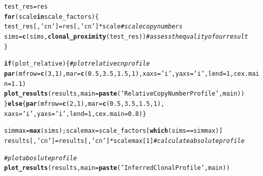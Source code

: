 \documentclass[12pt]{article}\usepackage[]{graphicx}\usepackage[]{color}
\makeatletter
\newcommand{\hlnum}[1]{\textcolor[rgb]{0.686,0.059,0.569}{#1}}%
\newcommand{\hlstr}[1]{\textcolor[rgb]{0.192,0.494,0.8}{#1}}%
\newcommand{\hlcom}[1]{\textcolor[rgb]{0.678,0.584,0.686}{\textit{#1}}}%
\newcommand{\hlopt}[1]{\textcolor[rgb]{0,0,0}{#1}}%
\newcommand{\hlstd}[1]{\textcolor[rgb]{0.345,0.345,0.345}{#1}}%
\newcommand{\hlkwa}[1]{\textcolor[rgb]{0.161,0.373,0.58}{\textbf{#1}}}%
\newcommand{\hlkwb}[1]{\textcolor[rgb]{0.69,0.353,0.396}{#1}}%
\newcommand{\hlkwc}[1]{\textcolor[rgb]{0.333,0.667,0.333}{#1}}%
\newcommand{\hlkwd}[1]{\textcolor[rgb]{0.737,0.353,0.396}{\textbf{#1}}}%
\newenvironment{kframe}{%
 \def\at@end@of@kframe{}%
 \ifinner\ifhmode%
  \def\at@end@of@kframe{\end{minipage}}%
  \begin{minipage}{\columnwidth}%
 \fi\fi%
 \def\FrameCommand##1{\hskip\@totalleftmargin \hskip-\fboxsep
 \colorbox{shadecolor}{##1}\hskip-\fboxsep
     \hskip-\linewidth \hskip-\@totalleftmargin \hskip\columnwidth}%
 \MakeFramed {\advance\hsize-\width
   \@totalleftmargin\z@ \linewidth\hsize
   \@setminipage}}%
 {\par\unskip\endMakeFramed%
 \at@end@of@kframe}
\newenvironment{knitrout}{}{} %
\makeatother
\begin{document}
\begin{knitrout}
\begin{kframe}
\begin{alltt}
  \hlstd{test_res}\hlkwb{=}\hlstd{res}
  \hlkwa{for} \hlstd{(scale} \hlkwa{in} \hlstd{scale_factors)\{}
    \hlstd{test_res[,}\hlstr{'cn'}\hlstd{]} \hlkwb{=} \hlstd{res[,}\hlstr{'cn'}\hlstd{]}\hlopt{*}\hlstd{scale} \hlcom{#scale copy numbers}
    \hlstd{sims} \hlkwb{=} \hlkwd{c}\hlstd{(sims,} \hlkwd{clonal_proximity}\hlstd{(test_res))} \hlcom{#assess the quality of our result}
  \hlstd{\}}

  \hlkwa{if} \hlstd{(plot_relative)\{}\hlcom{#plot relative cn profile}
    \hlkwd{par}\hlstd{(}\hlkwc{mfrow}\hlstd{=}\hlkwd{c}\hlstd{(}\hlnum{3}\hlstd{,}\hlnum{1}\hlstd{),}\hlkwc{mar}\hlstd{=}\hlkwd{c}\hlstd{(}\hlnum{0.5}\hlstd{,}\hlnum{3.5}\hlstd{,}\hlnum{1.5}\hlstd{,}\hlnum{1}\hlstd{),}\hlkwc{xaxs}\hlstd{=}\hlstr{'i'}\hlstd{,}\hlkwc{yaxs}\hlstd{=}\hlstr{'i'}\hlstd{,}\hlkwc{lend}\hlstd{=}\hlnum{1}\hlstd{,}\hlkwc{cex.main}\hlstd{=}\hlnum{1.1}\hlstd{)}
    \hlkwd{plot_results}\hlstd{(results,} \hlkwc{main} \hlstd{=} \hlkwd{paste}\hlstd{(}\hlstr{'Relative Copy Number Profile'}\hlstd{, main) )}
  \hlstd{\}}\hlkwa{else}\hlstd{\{}\hlkwd{par}\hlstd{(}\hlkwc{mfrow} \hlstd{=} \hlkwd{c}\hlstd{(}\hlnum{2}\hlstd{,}\hlnum{1}\hlstd{),} \hlkwc{mar} \hlstd{=} \hlkwd{c}\hlstd{(}\hlnum{0.5}\hlstd{,}\hlnum{3.5}\hlstd{,}\hlnum{1.5}\hlstd{,}\hlnum{1}\hlstd{),}
            \hlkwc{xaxs} \hlstd{=} \hlstr{'i'}\hlstd{,} \hlkwc{yaxs} \hlstd{=} \hlstr{'i'}\hlstd{,} \hlkwc{lend}\hlstd{=}\hlnum{1}\hlstd{,} \hlkwc{cex.main} \hlstd{=} \hlnum{0.8}\hlstd{)\}}

  \hlstd{simmax} \hlkwb{=} \hlkwd{max}\hlstd{(sims); scalemax} \hlkwb{=} \hlstd{scale_factors[}\hlkwd{which}\hlstd{(sims}\hlopt{==}\hlstd{simmax)]}
  \hlstd{results[,}\hlstr{'cn'}\hlstd{]} \hlkwb{=} \hlstd{results[,}\hlstr{'cn'}\hlstd{]}\hlopt{*}\hlstd{scalemax[}\hlnum{1}\hlstd{]} \hlcom{#calculate absolute profile}

  \hlcom{#plot aboslute profile}
  \hlkwd{plot_results}\hlstd{(results,} \hlkwc{main} \hlstd{=} \hlkwd{paste}\hlstd{(}\hlstr{'Inferred Clonal Profile'}\hlstd{, main) )}


\end{alltt}
\end{kframe}
\end{knitrout}
\end{document}
